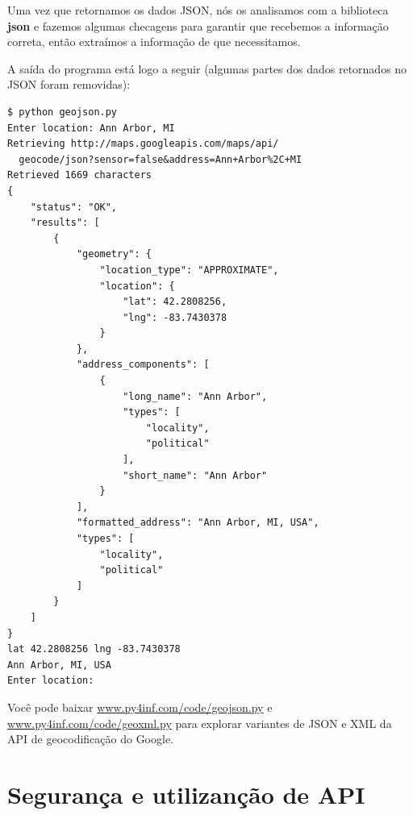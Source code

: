 Uma vez que retornamos os dados JSON, nós os analisamos com a 
biblioteca {\bf json} e fazemos algumas checagens para garantir que 
recebemos a informação correta, então extraímos a informação de que 
necessitamos.

A saída do programa está logo a seguir (algumas partes dos dados retornados
no JSON foram removidas):

\beforeverb
\begin{verbatim}
$ python geojson.py
Enter location: Ann Arbor, MI
Retrieving http://maps.googleapis.com/maps/api/
  geocode/json?sensor=false&address=Ann+Arbor%2C+MI
Retrieved 1669 characters
{
    "status": "OK", 
    "results": [
        {
            "geometry": {
                "location_type": "APPROXIMATE", 
                "location": {
                    "lat": 42.2808256, 
                    "lng": -83.7430378
                }
            }, 
            "address_components": [
                {
                    "long_name": "Ann Arbor", 
                    "types": [
                        "locality", 
                        "political"
                    ], 
                    "short_name": "Ann Arbor"
                } 
            ], 
            "formatted_address": "Ann Arbor, MI, USA", 
            "types": [
                "locality", 
                "political"
            ]
        }
    ]
}
lat 42.2808256 lng -83.7430378
Ann Arbor, MI, USA
Enter location:
\end{verbatim}
\afterverb

Você pode baixar
\url{www.py4inf.com/code/geojson.py} e
\url{www.py4inf.com/code/geoxml.py} para explorar
variantes de JSON e XML da API de geocodificação do Google.

\section{Segurança e utilizanção de API}

